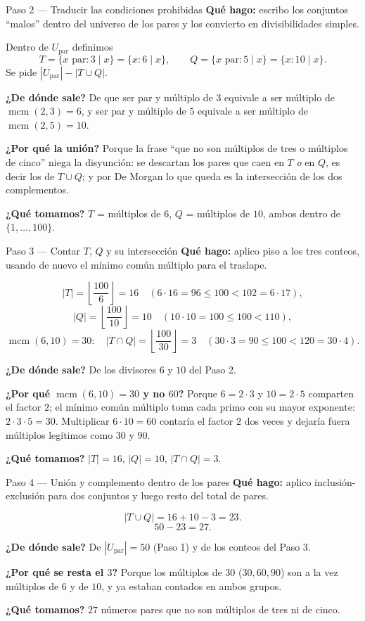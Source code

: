 \documentclass[11pt]{article}
\begin{document}
\begin{paso}{Paso 2 --- Traducir las condiciones prohibidas}
\textbf{Qué hago:} escribo los conjuntos ``malos'' dentro del universo de los pares y los convierto en divisibilidades simples.

Dentro de $U_{\text{par}}$ definimos
\[
T=\{x \text{ par}: 3\mid x\} = \{x: 6\mid x\},\qquad
Q=\{x \text{ par}: 5\mid x\} = \{x: 10\mid x\} .
\]
Se pide $|U_{\text{par}}| - |T\cup Q|$.

\textbf{¿De dónde sale?} De que ser par y múltiplo de $3$ equivale a ser múltiplo de $\operatorname{mcm}(2,3)=6$, y ser par y múltiplo de $5$ equivale a ser múltiplo de $\operatorname{mcm}(2,5)=10$.

\textbf{¿Por qué la unión?} Porque la frase ``que no son múltiplos de tres o múltiplos de cinco'' niega la disyunción: se descartan los pares que caen en $T$ \emph{o} en $Q$, es decir los de $T\cup Q$; y por De Morgan lo que queda es la intersección de los dos complementos.

\textbf{¿Qué tomamos?} $T$ = múltiplos de $6$, $Q$ = múltiplos de $10$, ambos dentro de $\{1,\dots,100\}$.
\end{paso}

\begin{paso}{Paso 3 --- Contar $T$, $Q$ y su intersección}
\textbf{Qué hago:} aplico piso a los tres conteos, usando de nuevo el mínimo común múltiplo para el traslape.

\[
|T| = \left\lfloor \frac{100}{6}\right\rfloor = 16 \quad (6\cdot 16 = 96\le 100 < 102 = 6\cdot 17),
\]
\[
|Q| = \left\lfloor \frac{100}{10}\right\rfloor = 10 \quad (10\cdot 10 = 100\le 100 < 110),
\]
\[
\operatorname{mcm}(6,10) = 30:\quad |T\cap Q| = \left\lfloor \frac{100}{30}\right\rfloor = 3 \quad (30\cdot 3 = 90\le 100 < 120 = 30\cdot 4).
\]

\textbf{¿De dónde sale?} De los divisores $6$ y $10$ del Paso 2.

\textbf{¿Por qué $\operatorname{mcm}(6,10)=30$ y no $60$?} Porque $6=2\cdot 3$ y $10=2\cdot 5$ comparten el factor $2$; el mínimo común múltiplo toma cada primo con su mayor exponente: $2\cdot 3\cdot 5 = 30$. Multiplicar $6\cdot 10=60$ contaría el factor $2$ dos veces y dejaría fuera múltiplos legítimos como $30$ y $90$.

\textbf{¿Qué tomamos?} $|T|=16$, $|Q|=10$, $|T\cap Q|=3$.
\end{paso}

\begin{paso}{Paso 4 --- Unión y complemento dentro de los pares}
\textbf{Qué hago:} aplico inclusión-exclusión para dos conjuntos y luego resto del total de pares.

\[
|T\cup Q| = 16+10-3 = 23 .
\]
\[
50 - 23 = 27 .
\]

\textbf{¿De dónde sale?} De $|U_{\text{par}}|=50$ (Paso 1) y de los conteos del Paso 3.

\textbf{¿Por qué se resta el $3$?} Porque los múltiplos de $30$ ($30,60,90$) son a la vez múltiplos de $6$ y de $10$, y ya estaban contados en ambos grupos.

\textbf{¿Qué tomamos?} $27$ números pares que no son múltiplos de tres ni de cinco.
\end{paso}
\end{document}
